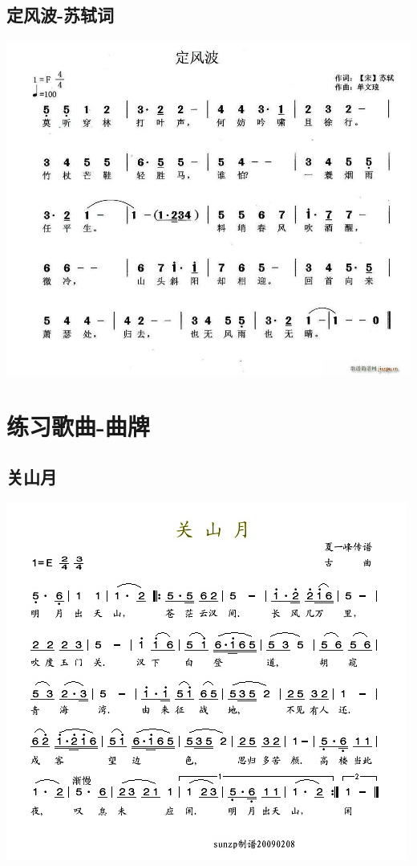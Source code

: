 \documentclass[cn,pad,chinese]{elegantbook}
\begin{document}
\section{定风波-苏轼词}
    \includegraphics[width=\textwidth]{dongxiao/20200411-定风波.jpg}
\chapter{练习歌曲-曲牌}
\section{关山月}
    \includegraphics[width=\textwidth]{dongxiao/20200411-清平乐-关山月.jpg}
\end{document}
